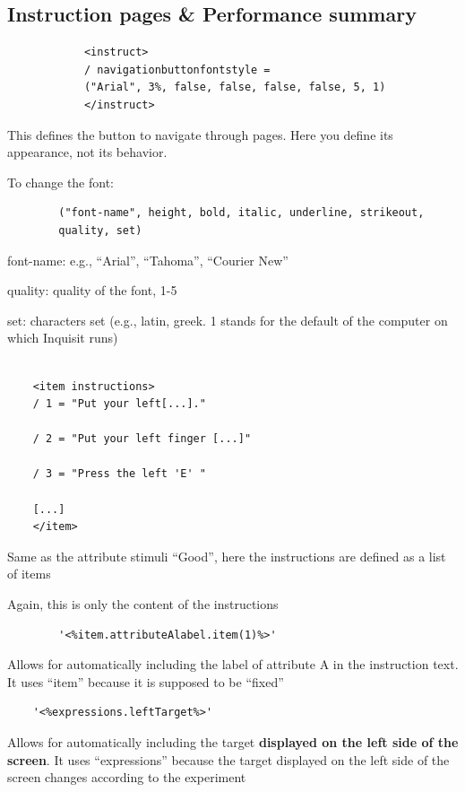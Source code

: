 \documentclass{beamer} %
\begin{document}
\subsection*{Instruction pages \& Performance summary}

\begin{frame}[fragile]
		\begin{verbatim}
			<instruct>
			/ navigationbuttonfontstyle = 
			("Arial", 3%, false, false, false, false, 5, 1)
			</instruct>
		\end{verbatim}
	
	This defines the button to navigate through pages. Here you define its appearance, not its behavior. 
	
	To change the font:
	
	\begin{verbatim}
		("font-name", height, bold, italic, underline, strikeout, 
		quality, set)
	\end{verbatim}

font-name: e.g., ``Arial'', ``Tahoma'', ``Courier New''

quality: quality of the font, 1-5

set: characters set (e.g., latin, greek. 1 stands for the default of the computer on which Inquisit runs)
	\end{frame}

\begin{frame}[fragile]
	
	\begin{verbatim}
		
	<item instructions>
	/ 1 = "Put your left[...]."
	
	/ 2 = "Put your left finger [...]"
	
	/ 3 = "Press the left 'E' "
	
	[...]
	</item>
\end{verbatim}

\vspace{5mm}
Same as the attribute stimuli ``Good'', here the instructions are defined as a list of items

Again, this is only the content of the instructions

\end{frame}

\begin{frame}[fragile]
	\begin{verbatim}
		'<%item.attributeAlabel.item(1)%>' 
	\end{verbatim}

Allows for automatically including the label of attribute A in the instruction text. It uses ``item'' because it is supposed to be ``fixed''

\begin{verbatim}
	'<%expressions.leftTarget%>'
\end{verbatim}

Allows for automatically including the target \textbf{displayed on the left side of the screen}. It uses ``expressions'' because the target displayed on the left side of the screen changes according to the experiment 

\end{frame}
\end{document}
